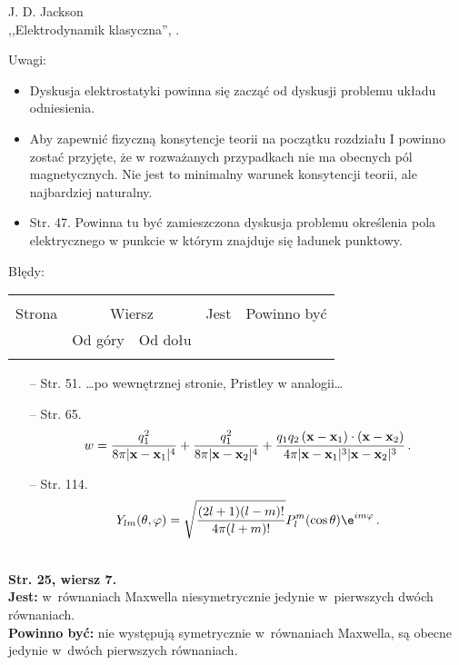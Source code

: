 \documentclass[a4paper,11pt]{article}
\newcommand{\de}{\mathrm{d}}
\begin{document}
%
%
%
\begin{center}
J. D. Jackson\\
,,Elektrodynamik klasyczna'', \cite{Jac87}.
\end{center}

Uwagi:\\
\begin{itemize}
\item Dyskusja elektrostatyki powinna się zacząć od dyskusji problemu układu odniesienia.
\item Aby zapewnić fizyczną konsytencje teorii na początku rozdziału I powinno zostać przyjęte, że w rozważanych przypadkach nie ma obecnych pól magnetycznych. Nie jest to minimalny warunek konsytencji teorii, ale najbardziej naturalny.
\item Str. 47. Powinna tu być zamieszczona dyskusja problemu określenia pola elektrycznego w punkcie w którym znajduje się ładunek punktowy.
\end{itemize}


Błędy:\\
\begin{tabular}{|c|c|c|c|c|}
\hline
& \multicolumn{2}{c|}{} & & \\
Strona & \multicolumn{2}{c|}{Wiersz} & Jest & Powinno być \\ \cline{2-3}
& Od góry & Od dołu &  &  \\ \hline
& & & & \\
\end{tabular}

\begin{itemize}
\item[--] Str. 51. \ldots po wewnętrznej stronie, Pristley w analogii\ldots
\item[--] Str. 65. $$w = \frac{ q^{ 2 }_{ 1 } }{ 8 \pi | \bold{ x } - \bold{ x }_{ 1 } |^{ 4 } } + \frac{ q^{ 2 }_{ 1 } }{ 8 \pi | \bold{ x } - \bold{ x }_{ 2 } |^{ 4 } } + \frac{ q_{ 1 } q_{ 2 } \, ( \bold{ x } - \bold{ x }_{ 1 } ) \cdot ( \bold{ x } - \bold{ x }_{ 2 } ) }{ 4 \pi | \bold{ x } - \bold{ x }_{ 1 } |^{ 3 } | \bold{ x } - \bold{ x }_{ 2 } |^{ 3 } } \, .$$
\item[--] Str. 114. $$Y_{ l m }( \theta, \varphi ) = \sqrt{ \frac{ ( 2l + 1 )( l - m )! }{ 4 \pi ( l + m )! } } P^{ m }_{ l }( \cos \theta ) \e^{ i m \varphi} \, .$$
\end{itemize}
\noindent\\
\textbf{Str. 25, wiersz 7.}\\
\textbf{Jest:} w~równaniach Maxwella niesymetrycznie jedynie w~pierwszych dwóch równaniach. \\
\textbf{Powinno być:} nie występują symetrycznie w~równaniach Maxwella, są obecne jedynie w~dwóch pierwszych równaniach. \\
\end{document}
